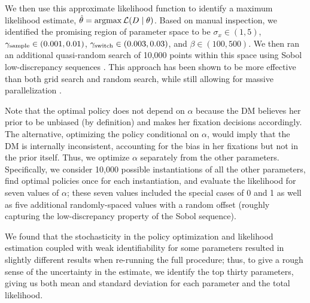 We then use this approximate likelihood function to identify a maximum likelihood estimate, $\hat{\theta}=\operatorname*{argmax} \mathcal{L}(D \mid \theta)$. Based on manual inspection, we identified the promising region of parameter space to be $\sigma_{x}\in(1,5)$, $\gamma_\text{sample}\in(0.001,0.01)$, $\gamma_\text{switch}\in(0.003,0.03)$, and $\beta\in(100,500)$.
We then ran an additional quasi-random search of 10,000 points within this space using Sobol low-discrepancy sequences \citep{sobol1967distribution}. This approach has been shown to be more effective than both grid search and random search, while still allowing for massive parallelization \citep{bergstra2012random}. 

Note that the optimal policy does not depend on $\alpha$ because the DM believes her prior to be unbiased (by definition) and makes her fixation decisions accordingly.
The alternative, optimizing the policy conditional on $\alpha$, would imply that the DM is internally inconsistent, accounting for the bias in her fixations but not in the prior itself.
Thus, we optimize $\alpha$ separately from the other parameters.
Specifically, we consider 10,000 possible instantiations of all the other parameters, find optimal policies once for each instantiation, and evaluate the likelihood for seven values of $\alpha$; these seven values included the special cases of 0 and 1 as well as five additional randomly-spaced values with a random offset (roughly capturing the low-discrepancy property of the Sobol sequence).


We found that the stochasticity in the policy optimization and likelihood estimation coupled with weak identifiability for some parameters resulted in slightly different results when re-running the full procedure; thus, to give a rough sense of the uncertainty in the estimate, we identify the top thirty parameters, giving us both mean and standard deviation for each parameter and the total likelihood.



